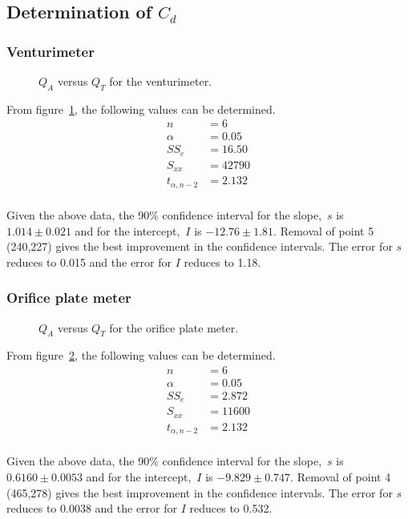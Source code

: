 \documentclass[a4paper]{article}
\begin{document}
\subsection{Determination of $C_d$}
\subsubsection{Venturimeter}
\begin{figure}[htbp]
\centering

\caption{$Q_A$ versus $Q_T$ for the venturimeter.}
\label{fig:qa-qt-v}
\end{figure}

From figure~\ref{fig:qa-qt-v}, the following values can be determined.
\begin{align*}
n &= 6 \\
\alpha &= 0.05 \\
SS_e &= 16.50 \\
S_{xx} &= 42790 \\
t_{\alpha,n-2} &= 2.132 \\
\end{align*}

Given the above data, the 90\% confidence interval 
for the slope,~$s$ is $1.014 \pm 0.021$ and 
for the intercept,~$I$ is $-12.76 \pm 1.81$.
Removal of point 5 (240,227) gives the best improvement 
in the confidence intervals. 
The error for $s$ reduces to 0.015 and the error for $I$ reduces to 1.18.

\subsubsection{Orifice plate meter}
\begin{figure}[htbp]
\centering

\caption{$Q_A$ versus $Q_T$ for the orifice plate meter.}
\label{fig:qa-qt-o}
\end{figure}
From figure~\ref{fig:qa-qt-o}, the following values can be determined.
\begin{align*}
n &= 6 \\
\alpha &= 0.05 \\
SS_e &= 2.872 \\
S_{xx} &= 11600 \\
t_{\alpha,n-2} &= 2.132 \\
\end{align*}

Given the above data, the 90\% confidence interval 
for the slope,~$s$ is $0.6160 \pm 0.0053$ and 
for the intercept,~$I$ is $-9.829 \pm 0.747$.
Removal of point 4 (465,278) gives the best improvement 
in the confidence intervals. 
The error for $s$ reduces to 0.0038 and the error for $I$ reduces to 0.532.
\end{document}
